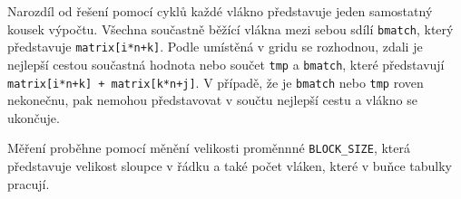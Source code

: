 \documentclass[a4paper,10pt]{article}
\begin{document}
Narozdíl od řešení pomocí cyklů každé vlákno představuje jeden samostatný kousek výpočtu. Všechna součastně běžící vlákna mezi sebou sdílí \texttt{bmatch}, který představuje \texttt{matrix[i*n+k]}. Podle umístěná v gridu se rozhodnou, zdali je nejlepší cestou součastná hodnota nebo součet \texttt{tmp} a \texttt{bmatch}, které představují \texttt{matrix[i*n+k] + matrix[k*n+j]}. V případě, že je \texttt{bmatch} nebo \texttt{tmp} roven nekonečnu, pak nemohou představovat v součtu nejlepší cestu a vlákno se ukončuje.

Měření proběhne pomocí měnění velikosti proměnnné \texttt{BLOCK\_SIZE}, která představuje velikost sloupce v řádku a také počet vláken, které v buňce tabulky pracují.




\end{document}
